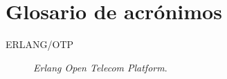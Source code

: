 \chapter*{Glosario de acrónimos}
\label{chap:acronimos}


\begin{description}
 \item [ERLANG/OTP] \emph{Erlang Open Telecom Platform}.
\end{description}

